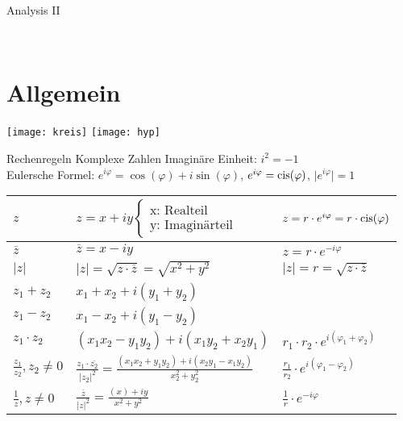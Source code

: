 \begin{center}
\begin{Huge}Analysis II\end{Huge}\\
\end{center}

\vspace{-2em}
\section{Allgemein}

\texttt{[image: kreis]}
\texttt{[image: hyp]}

\begin{Rechenregeln}{Rechenregeln Komplexe Zahlen}{}
    Imaginäre Einheit: \(i^{2} = -1\) \\
    Eulersche Formel: \( e^{i\varphi} = \cos(\varphi) + i\sin(\varphi) \), \(e^{i\varphi} = \operatorname{cis}(\varphi)\), \(\vert e^{i\varphi}\vert = 1\)	\\
    \begin{tabular}{|l|l|l|}
        \hline
        \(z\) & $ z = x + iy  \left\{
        \begin{array}{l}
        \text{x: Realteil}\\ \text{y: Imaginärteil}
        \end{array}
        \right. $  & \(z = r \cdot e^{i\varphi} = r \cdot \operatorname{cis}(\varphi)  \)\\ 
        \hline
        \(\overline{z}\) & \(\overline{z} = x - iy\) & \(z = r \cdot e^{-i\varphi}\)\\ 
        \hline
        \(\vert z \vert\) & \(\vert z \vert = \sqrt{z \cdot \overline{z}} = \sqrt{x^{2} + y^{2}}\) & \(\vert z \vert = r =\sqrt{z \cdot \overline{z}}\)\\ 
        \hline
        \(z_1 + z_2\) & \(x_1+x_2 + i(y_1+y_2)\) & \\
        \hline
        \(z_1 - z_2\) & \(x_1-x_2 + i(y_1-y_2)\) & \\
        \hline
        \(z_1 \cdot z_2\) & \((x_1x_2 - y_1y_2) + i(x_1y_2 + x_2y_1)\) & \(r_1 \cdot r_2 \cdot 
        e^{i(\varphi_1+\varphi_2)}\)\\
        \hline
        \(\frac{z_1}{z_2}, z_2 \neq 0\) & \(\frac{z_1 \cdot \overline{z_2}}{\vert z_2 \vert ^{2}} = \frac{(x_1x_2+y_1y_2)+i(x_2y_1-x_1y_2)}{x_2^{2}+y_2^{2}} \) & \(\frac{r_1}{r_2} \cdot e^{i(\varphi_1 - \varphi_2)}\)\\
        \hline
        \(\frac{1}{z}, z \neq 0\) & \(\frac{\overline{z}}{\vert z \vert ^{2}} = \frac{(x)+iy}{x^{2}+y^{2}} \) & \(\frac{1}{r} \cdot e^{-i\varphi}\)\\

\end{tabular}
\end{Rechenregeln}
